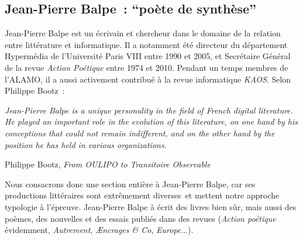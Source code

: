 \documentclass{article}
\newenvironment{citationbox}
{\begin{center}
		\begin{minipage}{.8\textwidth}
		}
		{
		\end{minipage}	
\end{center}
}
\begin{document}
		\subsection{Jean-Pierre Balpe~: ``poète de synthèse''}\label{balpe}
			Jean-Pierre Balpe est un écrivain et chercheur dans le domaine de la relation entre littérature et informatique. Il a notamment été directeur du département Hypermédia de l'Université Paris VIII entre 1990 et 2005, et Secrétaire Général de la revue \textit{Action Poétique} entre 1974 et 2010. Pendant un temps membres de l'ALAMO, il a aussi activement contribué à la revue informatique \textit{KAOS}. Selon Philippe Bootz~:
			\begin{citationbox}
				\textit{Jean-Pierre Balpe is a unique personality in the field of French digital literature. He played an important role in the evolution of this literature, on one hand by his conceptions that could not remain indifferent, and on the other hand by the position he has held in various organizations.}
				\begin{flushright}
					Philippe Bootz, \textit{From OULIPO to Transitoire Observable} \cite{bootz2012}
				\end{flushright}
			\end{citationbox}
			Nous consacrons donc une section entière à Jean-Pierre Balpe, car ses productions littéraires sont extrêmement diverses et mettent notre approche typologie à l'épreuve. Jean-Pierre Balpe à écrit des livres bien sûr, mais aussi des poèmes, des nouvelles et des essais publiés dans des revues (\textit{Action poétique} évidemment, \textit{Autrement}, \textit{Æncrages \& Co}, \textit{Europe}...).\\
			
\end{document}
